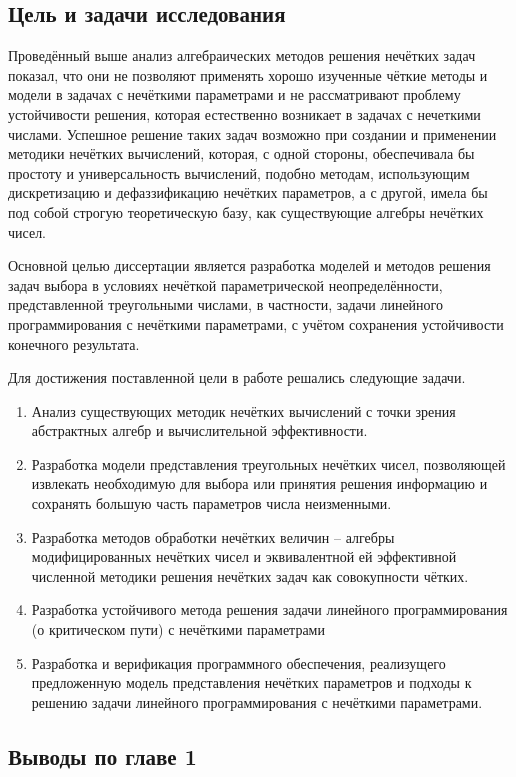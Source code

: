 \subsection{Цель и задачи исследования}

Проведённый выше анализ алгебраических методов решения нечётких задач показал, что они не позволяют применять хорошо изученные чёткие методы и модели в задачах с нечёткими параметрами и не рассматривают проблему устойчивости решения, которая естественно возникает в задачах с нечеткими числами. Успешное решение таких задач возможно при создании и применении методики нечётких вычислений, которая, с одной стороны, обеспечивала бы простоту и универсальность вычислений, подобно методам, использующим дискретизацию и дефаззификацию нечётких параметров, а с другой, имела бы под собой строгую теоретическую базу, как существующие алгебры нечётких чисел.

Основной целью диссертации является разработка моделей и методов решения задач выбора в условиях нечёткой параметрической неопределённости, представленной треугольными числами, в частности, задачи линейного программирования с нечёткими параметрами, с учётом сохранения устойчивости конечного результата.

Для достижения поставленной цели в работе решались следующие задачи.

\begin{enumerate}
	\item Анализ существующих методик нечётких вычислений с точки зрения абстрактных алгебр и вычислительной эффективности.
	\item Разработка модели представления треугольных нечётких чисел, позволяющей извлекать необходимую для выбора или принятия решения информацию и сохранять большую часть параметров числа неизменными. 
	\item Разработка методов обработки нечётких величин – алгебры модифицированных нечётких чисел и эквивалентной ей эффективной численной методики решения нечётких задач как совокупности чётких.
	\item Разработка устойчивого метода решения задачи линейного программирования (о критическом пути) с нечёткими параметрами
	\item Разработка и верификация программного обеспечения, реализущего предложенную модель представления нечётких параметров и подходы к решению задачи линейного программирования с нечёткими параметрами.
\end{enumerate}

\subsection{Выводы по главе 1}